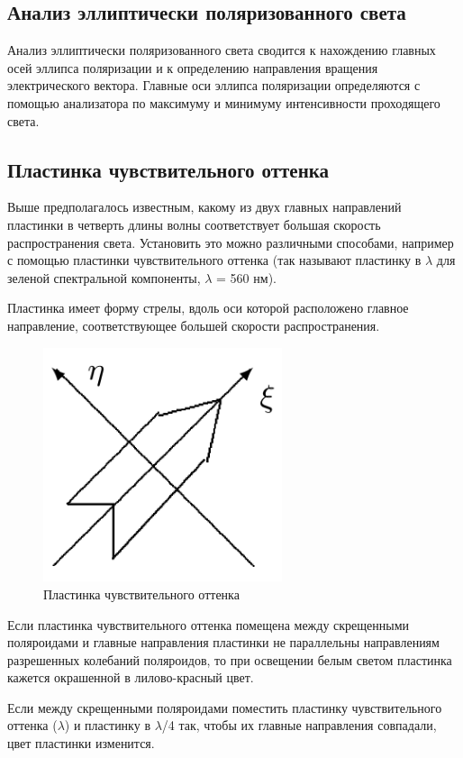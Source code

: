 \documentclass[12pt,a4paper]{article}
\begin{document}
	
	\subsection*{Анализ эллиптически поляризованного света}Анализ эллиптически поляризованного света сводится к нахождению главных осей эллипса поляризации и к определению направления вращения электрического вектора. Главные оси эллипса поляризации определяются с помощью анализатора по максимуму и минимуму интенсивности проходящего света.

	\subsection*{Пластинка чувствительного оттенка} Выше предполагалось известным, какому из двух главных направлений пластинки в четверть длины волны соответствует большая скорость распространения света. Установить это можно различными способами, например с помощью пластинки чувствительного оттенка (так называют пластинку в $\lambda$ для зеленой спектральной компоненты, $\lambda$ = 560 нм).	
	
	Пластинка имеет форму стрелы, вдоль оси которой расположено главное направление, соответствующее большей скорости распространения.

 	\begin{figure}[h!]
		\centering
		\includegraphics[width=7cm]{res/SensitivePlate}
		\caption{Пластинка чувствительного оттенка}
	\end{figure}
	
	Если пластинка чувствительного оттенка помещена между скрещенными поляроидами и главные направления пластинки не параллельны направлениям разрешенных колебаний поляроидов, то при освещении белым светом пластинка кажется окрашенной в лилово-красный цвет.
	
	Если между скрещенными поляроидами поместить пластинку чувствительного оттенка ($\lambda$) и пластинку в $\lambda$/4 так, чтобы их главные направления совпадали, цвет пластинки изменится.
	
\end{document}
